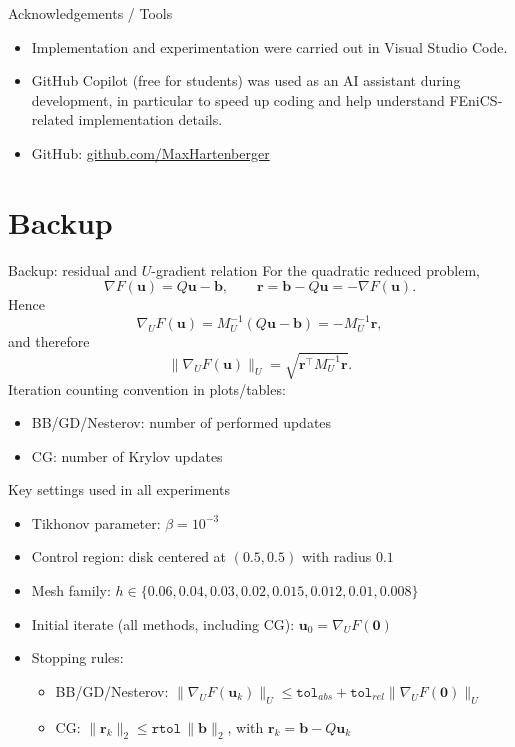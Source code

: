 \documentclass[aspectratio=169,11pt]{beamer}
\begin{document}
\begin{frame}{Acknowledgements / Tools}
\begin{itemize}
  \item Implementation and experimentation were carried out in Visual Studio Code.
  \item GitHub Copilot (free for students) was used as an AI assistant during development, in particular to speed up coding and help understand FEniCS-related implementation details.
  \item GitHub: \href{https://github.com/MaxHartenberger/}{github.com/MaxHartenberger}
\end{itemize}
\end{frame}

\appendix
\section*{Backup}

\begin{frame}{Backup: residual and $U$-gradient relation}
For the quadratic reduced problem,
\[
  \nabla F(\bm u)=Q\bm u-\bm b,\qquad \bm r=\bm b-Q\bm u=-\nabla F(\bm u).
\]
Hence
\[
  \nabla_U F(\bm u)=M_U^{-1}(Q\bm u-\bm b)=-M_U^{-1}\bm r,
\]
and therefore
\[
  \|\nabla_U F(\bm u)\|_U=\sqrt{\bm r^\top M_U^{-1}\bm r}.
\]
Iteration counting convention in plots/tables:
\begin{itemize}
  \item BB/GD/Nesterov: number of performed updates
  \item CG: number of Krylov updates
\end{itemize}
\end{frame}

\begin{frame}{Key settings used in all experiments}
\small
\begin{itemize}
  \item Tikhonov parameter: $\beta=10^{-3}$
  \item Control region: disk centered at $(0.5,0.5)$ with radius $0.1$
  \item Mesh family: $h\in\{0.06,0.04,0.03,0.02,0.015,0.012,0.01,0.008\}$
  \item Initial iterate (all methods, including CG): $\bm u_0=\nabla_U F(\bm 0)$
  \item Stopping rules:
  \begin{itemize}
    \item BB/GD/Nesterov: $\|\nabla_U F(\bm u_k)\|_U \le \texttt{tol}_{abs}+\texttt{tol}_{rel}\|\nabla_U F(\bm 0)\|_U$
    \item CG: $\|\bm r_k\|_2\le \texttt{rtol}\,\|\bm b\|_2$, with $\bm r_k=\bm b-Q\bm u_k$
  \end{itemize}
\end{itemize}
\end{frame}
\end{document}
